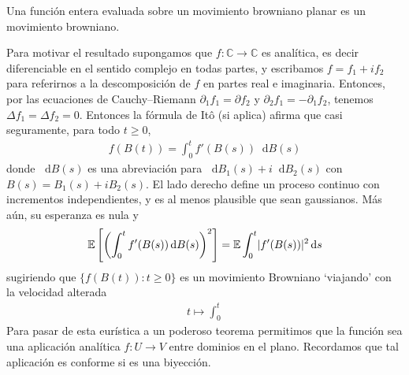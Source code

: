 \documentclass{article}
\newcommand{\ito}{Itô}
\newcommand{\Expectation}{\mathbb{E}}
\newcommand{\dd}{\mathop{}\!\mathrm{d}}\newcommand{\complexNumbers}{\mathbb{C}}
\DeclarePairedDelimiter{\abs}{\lvert}{\rvert}
\theoremstyle{plain}
\theoremstyle{remark}
\begin{document}
Una función entera evaluada sobre un movimiento browniano planar es un movimiento browniano.


Para motivar el resultado supongamos que \(f : \complexNumbers \rightarrow \complexNumbers\) es analítica, es decir diferenciable en el sentido complejo en todas partes, y escribamos \(f = f_1 + i f_2\) para referirnos a la descomposición de \(f\) en partes real e imaginaria.
Entonces, por las ecuaciones de Cauchy--Riemann \(\partial_1 f_1 = \partial f_2\) y \(\partial_2 f_1 = - \partial_1 f_2\), tenemos \(\Delta f_1 = \Delta f_2 = 0\).
Entonces la fórmula de \ito{} (si aplica) afirma que casi seguramente, para todo \(t \geq 0\),
\begin{align}
  f(B(t))
  =
  \int_0^t f'(B(s)) \dd B(s)
\end{align}
donde \(\dd B(s)\) es una abreviación para \(\dd B_1(s) + i \dd B_2(s)\) con \(B(s) = B_1(s) + i B_2(s)\).
El lado derecho define un proceso continuo con incrementos independientes, y es al menos plausible que sean gaussianos.
Más aún, su esperanza es nula y
\begin{align}
  \Expectation \left[ \left( \int_0^t f'(B(s)) \dd B(s) \right)^2 \right]
  =
  \Expectation \int_0^t \abs{f'(B(s))}^2 \dd s
\end{align}
sugiriendo que \(\{f(B(t)) : t \geq 0\}\) es un movimiento Browniano `viajando' con la velocidad alterada
\begin{align}
  t
  \mapsto
  \int_0^t
\end{align}
Para pasar de esta eurística a un poderoso teorema permitimos que la función sea una aplicación analítica \(f : U \rightarrow V\) entre dominios en el plano.
Recordamos que tal aplicación es conforme si es una biyección.
\end{document}
